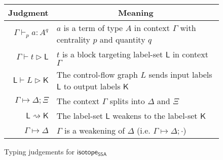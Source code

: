 \documentclass[acmsmall,screen,review]{acmart}
\newcommand{\ms}[1]{\ensuremath{\mathsf{#1}}}
\newcommand{\csplits}[3]{#1 \mapsto #2;#3}
\newcommand{\cwk}[2]{#1 \mapsto #2}
\newcommand{\lwk}[2]{#1 \rightsquigarrow #2}
\newcommand{\tlin}[2]{#2 \subseteq \ms{lin}(#1)}
\newcommand{\ltlin}[3]{#3 \subseteq \ms{lin}(#1) \cap #2}
\newcommand{\hasty}[5]{#1 \vdash_{#2} #3: {#4}^{#5}}
\newcommand{\haslb}[3]{#1 \vdash #2 \rhd #3}
\newcommand{\lhaslb}[3]{#1 \vdash #2 \rhd #3}
\newcommand{\isotopessa}{\ms{isotope_{SSA}}}
\begin{document}
\begin{figure}
  \begin{center}        
    \begingroup
    \renewcommand{\arraystretch}{1.5}
    \setlength{\tabcolsep}{2em}
    \begin{tabular}{rl}
        \multicolumn{1}{c}{Judgment} & \multicolumn{1}{c}{Meaning} \\ \hline
        \(\hasty{\Gamma}{p}{a}{A}{q}\) & \(a\) is a term of type \(A\) in
        context \(\Gamma\) with centrality \(p\) and quantity \(q\) \\
        \(\haslb{\Gamma}{t}{\ms{L}}\) & \(t\) is a block targeting label-set
        \(\ms{L}\) in context \(\Gamma\) \\
        \(\lhaslb{\ms{L}}{L}{\ms{K}}\) & The control-flow graph \(L\) sends
        input labels \(\ms{L}\) to output labels \(\ms{K}\) \\
        \(\csplits{\Gamma}{\Delta}{\Xi}\) & The context \(\Gamma\) splits into
        \(\Delta\) and \(\Xi\) \\
        \(\lwk{\ms{L}}{\ms{K}}\) & The label-set \(\ms{L}\) weakens to the
        label-set \(\ms{K}\) \\
        \(\cwk{\Gamma}{\Delta}\) & \(\Gamma\) is a weakening of \(\Delta\) (i.e.
        \(\csplits{\Gamma}{\Delta}{\cdot}\))
    \end{tabular}
    \endgroup
  \end{center}
  \caption{Typing judgements for \isotopessa}
  \label{fig:ssa-judgements}
\end{figure}
\end{document}
